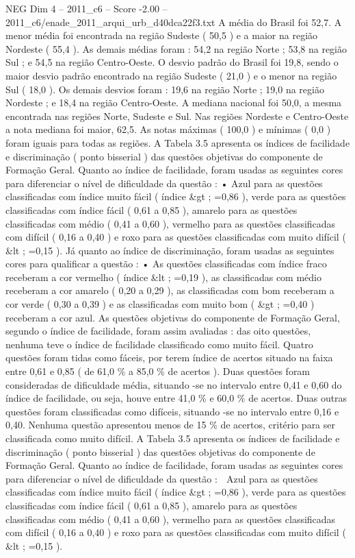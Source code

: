 \begin{textsample}{NEG Dim 4 – 2011\_c6 – Score -2.00 – 2011\_c6/enade\_2011\_arqui\_urb\_d40dca22f3.txt}
A média do Brasil foi 52,7.
A menor média foi encontrada na região Sudeste ( 50,5 ) e a maior na região Nordeste ( 55,4 ).
As demais médias foram : 54,2 na região Norte ; 53,8 na região Sul ; e 54,5 na região Centro-Oeste.
O desvio padrão do Brasil foi 19,8, sendo o maior desvio padrão encontrado na região Sudeste ( 21,0 ) e o menor na região Sul ( 18,0 ).
Os demais desvios foram : 19,6 na região Norte ; 19,0 na região Nordeste ; e 18,4 na região Centro-Oeste.
A mediana nacional foi 50,0, a mesma encontrada nas regiões Norte, Sudeste e Sul.
Nas regiões Nordeste e Centro-Oeste a nota mediana foi maior, 62,5.
As notas máximas ( 100,0 ) e mínimas ( 0,0 ) foram iguais para todas as regiões.
A Tabela 3.5 apresenta os índices de facilidade e discriminação ( ponto bisserial ) das questões objetivas do componente de Formação Geral.
Quanto ao índice de facilidade, foram usadas as seguintes cores para diferenciar o nível de dificuldade da questão : • Azul para as questões classificadas com índice muito fácil ( índice \&gt ; =0,86 ), verde para as questões classificadas com índice fácil ( 0,61 a 0,85 ), amarelo para as questões classificadas com médio ( 0,41 a 0,60 ), vermelho para as questões classificadas com difícil ( 0,16 a 0,40 ) e roxo para as questões classificadas com muito difícil ( \&lt ; =0,15 ).
Já quanto ao índice de discriminação, foram usadas as seguintes cores para qualificar a questão : • As questões classificadas com índice fraco receberam a cor vermelho ( índice \&lt ; =0,19 ), as classificadas com médio receberam a cor amarelo ( 0,20 a 0,29 ), as classificadas com bom receberam a cor verde ( 0,30 a 0,39 ) e as classificadas com muito bom ( \&gt ; =0,40 ) receberam a cor azul.
As questões objetivas do componente de Formação Geral, segundo o índice de facilidade, foram assim avaliadas : das oito questões, nenhuma teve o índice de facilidade classificado como muito fácil.
Quatro questões foram tidas como fáceis, por terem índice de acertos situado na faixa entre 0,61 e 0,85 ( de 61,0 \% a 85,0 \% de acertos ).
Duas questões foram consideradas de dificuldade média, situando -se no intervalo entre 0,41 e 0,60 do índice de facilidade, ou seja, houve entre 41,0 \% e 60,0 \% de acertos.
Duas outras questões foram classificadas como difíceis, situando -se no intervalo entre 0,16 e 0,40.
Nenhuma questão apresentou menos de 15 \% de acertos, critério para ser classificada como muito difícil.
A Tabela 3.5 apresenta os índices de facilidade e discriminação ( ponto bisserial ) das questões objetivas do componente de Formação Geral.
Quanto ao índice de facilidade, foram usadas as seguintes cores para diferenciar o nível de dificuldade da questão :  Azul para as questões classificadas com índice muito fácil ( índice \&gt ; =0,86 ), verde para as questões classificadas com índice fácil ( 0,61 a 0,85 ), amarelo para as questões classificadas com médio ( 0,41 a 0,60 ), vermelho para as questões classificadas com difícil ( 0,16 a 0,40 ) e roxo para as questões classificadas com muito difícil ( \&lt ; =0,15 ).

\end{textsample}
